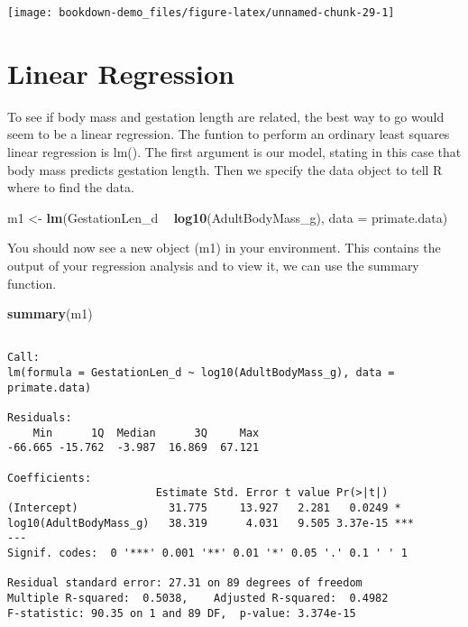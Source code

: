 \documentclass[]{book}
\newenvironment{Shaded}{\begin{snugshade}}{\end{snugshade}}
\newcommand{\KeywordTok}[1]{\textcolor[rgb]{0.13,0.29,0.53}{\textbf{#1}}}
\newcommand{\DataTypeTok}[1]{\textcolor[rgb]{0.13,0.29,0.53}{#1}}
\newcommand{\StringTok}[1]{\textcolor[rgb]{0.31,0.60,0.02}{#1}}
\newcommand{\OperatorTok}[1]{\textcolor[rgb]{0.81,0.36,0.00}{\textbf{#1}}}
\newcommand{\NormalTok}[1]{#1}
\begin{document}
\begin{center}\texttt{[image: bookdown-demo\_files/figure-latex/unnamed-chunk-29-1]} \end{center}

\section{Linear Regression}\label{linear-regression}

To see if body mass and gestation length are related, the best way to go
would seem to be a linear regression. The funtion to perform an ordinary
least squares linear regression is lm(). The first argument is our
model, stating in this case that body mass predicts gestation length.
Then we specify the data object to tell R where to find the data.

\begin{Shaded}
\begin{Highlighting}[]
\NormalTok{m1 <-}\StringTok{ }\KeywordTok{lm}\NormalTok{(GestationLen_d }\OperatorTok{~}\StringTok{ }\KeywordTok{log10}\NormalTok{(AdultBodyMass_g), }\DataTypeTok{data =}\NormalTok{ primate.data)}
\end{Highlighting}
\end{Shaded}

You should now see a new object (m1) in your environment. This contains
the output of your regression analysis and to view it, we can use the
summary function.

\begin{Shaded}
\begin{Highlighting}[]
\KeywordTok{summary}\NormalTok{(m1)}
\end{Highlighting}
\end{Shaded}

\begin{verbatim}

Call:
lm(formula = GestationLen_d ~ log10(AdultBodyMass_g), data = primate.data)

Residuals:
    Min      1Q  Median      3Q     Max 
-66.665 -15.762  -3.987  16.869  67.121 

Coefficients:
                       Estimate Std. Error t value Pr(>|t|)    
(Intercept)              31.775     13.927   2.281   0.0249 *  
log10(AdultBodyMass_g)   38.319      4.031   9.505 3.37e-15 ***
---
Signif. codes:  0 '***' 0.001 '**' 0.01 '*' 0.05 '.' 0.1 ' ' 1

Residual standard error: 27.31 on 89 degrees of freedom
Multiple R-squared:  0.5038,    Adjusted R-squared:  0.4982 
F-statistic: 90.35 on 1 and 89 DF,  p-value: 3.374e-15
\end{verbatim}
\end{document}
